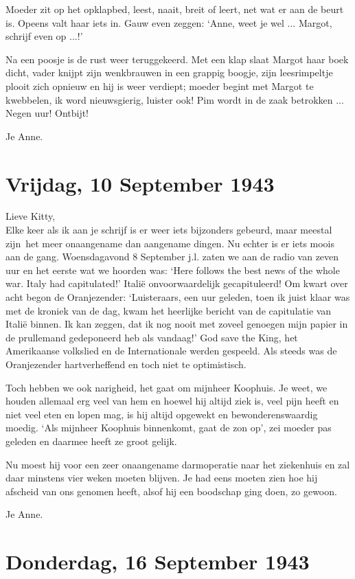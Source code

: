\documentclass{book}
\begin{document}
Moeder zit op het opklapbed, leest, naait, breit of leert, net wat er aan de
beurt is. Opeens valt haar iets in. Gauw even zeggen: `Anne, weet je wel ...
Margot, schrijf even op ...!'

Na een poosje is de rust weer teruggekeerd. Met een klap slaat Margot haar boek
dicht, vader knijpt zijn wenkbrauwen in een grappig boogje, zijn leesrimpeltje
plooit zich opnieuw en hij is weer verdiept; moeder begint met Margot te
kwebbelen, ik word nieuwsgierig, luister ook! Pim wordt in de zaak betrokken ...
Negen uur! Ontbijt!

Je Anne.

\section*{Vrijdag, 10 September 1943}

Lieve Kitty,\\
Elke keer als ik aan je schrijf is er weer iets bijzonders
gebeurd, maar meestal zijn~het meer onaangename dan aangename dingen. Nu echter
is er iets moois aan de gang. Woensdagavond 8 September j.l. zaten we aan de
radio van zeven uur en het eerste wat we hoorden was: `Here follows the best
news of the whole war. Italy had capitulated!' Italië onvoorwaardelijk
gecapituleerd! Om kwart over acht begon de Oranjezender: `Luisteraars, een uur
geleden, toen ik juist klaar was met de kroniek van de dag, kwam het heerlijke
bericht van de capitulatie van Italië binnen. Ik kan zeggen, dat ik nog nooit
met zoveel genoegen mijn papier in de prullemand gedeponeerd heb als vandaag!'
God save the King, het Amerikaanse volkslied en de Internationale werden
gespeeld. Als steeds was de Oranjezender hartverheffend en toch niet te
optimistisch.

Toch hebben we ook narigheid, het gaat om mijnheer Koophuis. Je weet, we houden
allemaal erg veel van hem en hoewel hij altijd ziek is, veel pijn heeft en niet
veel eten en lopen mag, is hij altijd opgewekt en bewonderenswaardig moedig.
`Als mijnheer Koophuis binnenkomt, gaat de zon op', zei moeder pas geleden en
daarmee heeft ze groot gelijk.

Nu moest hij voor een zeer onaangename darmoperatie naar het ziekenhuis en zal
daar minstens vier weken moeten blijven. Je had eens moeten zien hoe hij
afscheid van ons genomen heeft, alsof hij een boodschap ging doen, zo gewoon.

Je Anne.

\section*{Donderdag, 16 September 1943}
\end{document}
